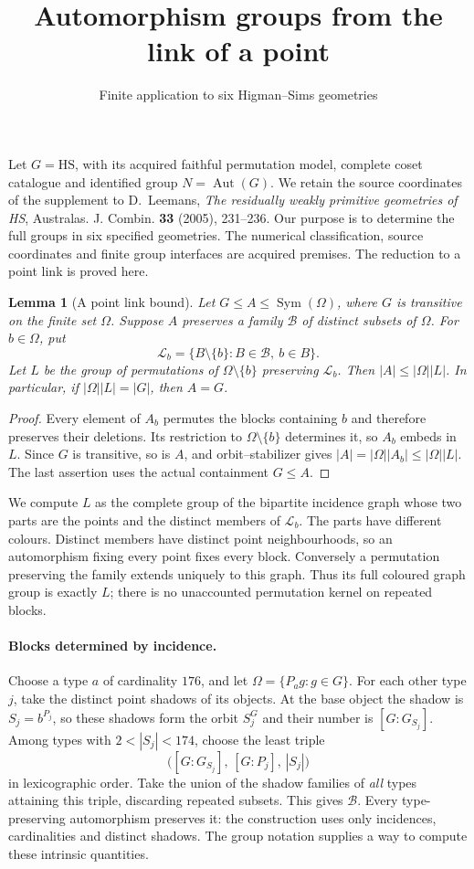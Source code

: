 \documentclass[11pt]{article}
\title{Automorphism groups from the link of a point}
\author{Finite application to six Higman--Sims geometries}\date{}
\newtheorem{lemma}{Lemma}\newtheorem{theorem}[lemma]{Theorem}
\newcommand{\Aut}{\operatorname{Aut}}\newcommand{\Cor}{\operatorname{Cor}}
\begin{document}
\maketitle
Let $G=\mathrm{HS}$, with its acquired faithful permutation model,
complete coset catalogue and identified group $N=\Aut(G)$.
We retain the source coordinates of the supplement to D.~Leemans,
\emph{The residually weakly primitive geometries of HS},
Australas. J. Combin. \textbf{33} (2005), 231--236.
Our purpose is to determine the full groups in six specified geometries.
The numerical classification, source coordinates and finite group interfaces
are acquired premises. The reduction to a point link is proved here.

\begin{lemma}[A point link bound]
Let $G\leq A\leq\operatorname{Sym}(\Omega)$, where $G$ is transitive on
the finite set $\Omega$. Suppose $A$ preserves a family $\mathcal B$ of
distinct subsets of $\Omega$. For $b\in\Omega$, put
\[
 \mathcal L_b=\{B\setminus\{b\}:B\in\mathcal B,\ b\in B\}.
\]
Let $L$ be the group of permutations of $\Omega\setminus\{b\}$ preserving
$\mathcal L_b$. Then $|A|\leq |\Omega||L|$.
In particular, if $|\Omega||L|=|G|$, then $A=G$.
\end{lemma}
\begin{proof}
Every element of $A_b$ permutes the blocks containing $b$ and therefore
preserves their deletions. Its restriction to $\Omega\setminus\{b\}$
determines it, so $A_b$ embeds in $L$. Since $G$ is transitive, so is
$A$, and orbit--stabilizer gives $|A|=|\Omega||A_b|\leq|\Omega||L|$.
The last assertion uses the actual containment $G\leq A$.
\end{proof}

We compute $L$ as the complete group of the bipartite incidence graph
whose two parts are the points and the distinct members of $\mathcal L_b$.
The parts have different colours. Distinct members have distinct point
neighbourhoods, so an automorphism fixing every point fixes every block.
Conversely a permutation preserving the family extends uniquely to this
graph. Thus its full coloured graph group is exactly $L$; there is no
unaccounted permutation kernel on repeated blocks.

\paragraph{Blocks determined by incidence.}
Choose a type $a$ of cardinality $176$, and let $\Omega=\{P_a g:g\in G\}$.
For each other type $j$, take the distinct point shadows of its objects.
At the base object the shadow is $S_j=b^{P_j}$, so these shadows form
the orbit $S_j^G$ and their number is $[G:G_{S_j}]$.
Among types with $2<|S_j|<174$, choose the least triple
\[
 \bigl([G:G_{S_j}],\,[G:P_j],\,|S_j|\bigr)
\]
in lexicographic order. Take the union of the shadow families of
\emph{all} types attaining this triple, discarding repeated subsets.
This gives $\mathcal B$. Every type-preserving automorphism preserves it:
the construction uses only incidences, cardinalities and distinct shadows.
The group notation supplies a way to compute these intrinsic quantities.
\end{document}
